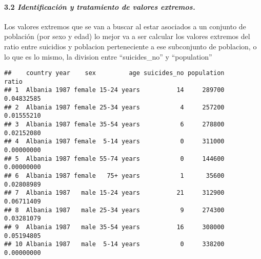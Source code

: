 \documentclass[]{article}
\newenvironment{Shaded}{\begin{snugshade}}{\end{snugshade}}
\newcommand{\KeywordTok}[1]{\textcolor[rgb]{0.13,0.29,0.53}{\textbf{#1}}}
\newcommand{\DataTypeTok}[1]{\textcolor[rgb]{0.13,0.29,0.53}{#1}}
\newcommand{\DecValTok}[1]{\textcolor[rgb]{0.00,0.00,0.81}{#1}}
\newcommand{\StringTok}[1]{\textcolor[rgb]{0.31,0.60,0.02}{#1}}
\newcommand{\ControlFlowTok}[1]{\textcolor[rgb]{0.13,0.29,0.53}{\textbf{#1}}}
\newcommand{\OperatorTok}[1]{\textcolor[rgb]{0.81,0.36,0.00}{\textbf{#1}}}
\newcommand{\NormalTok}[1]{#1}
\let\oldparagraph\paragraph
\renewcommand{\paragraph}[1]{\oldparagraph{#1}\mbox{}}
\begin{document}
\paragraph{\texorpdfstring{3.2 \emph{Identificación y tratamiento de
valores
extremos.}}{3.2 Identificación y tratamiento de valores extremos.}}\label{identificacion-y-tratamiento-de-valores-extremos.}

Los valores extremos que se van a buscar al estar asociados a un
conjunto de población (por sexo y edad) lo mejor va a ser calcular los
valores extremos del ratio entre suicidios y poblacion perteneciente a
ese subconjunto de poblacion, o lo que es lo mismo, la division entre
``suicides\_no'' y ``population''

\begin{Shaded}
\end{Shaded}

\begin{verbatim}
##    country year    sex         age suicides_no population      ratio
## 1  Albania 1987 female 15-24 years          14     289700 0.04832585
## 2  Albania 1987 female 25-34 years           4     257200 0.01555210
## 3  Albania 1987 female 35-54 years           6     278800 0.02152080
## 4  Albania 1987 female  5-14 years           0     311000 0.00000000
## 5  Albania 1987 female 55-74 years           0     144600 0.00000000
## 6  Albania 1987 female   75+ years           1      35600 0.02808989
## 7  Albania 1987   male 15-24 years          21     312900 0.06711409
## 8  Albania 1987   male 25-34 years           9     274300 0.03281079
## 9  Albania 1987   male 35-54 years          16     308000 0.05194805
## 10 Albania 1987   male  5-14 years           0     338200 0.00000000
\end{verbatim}
\end{document}
